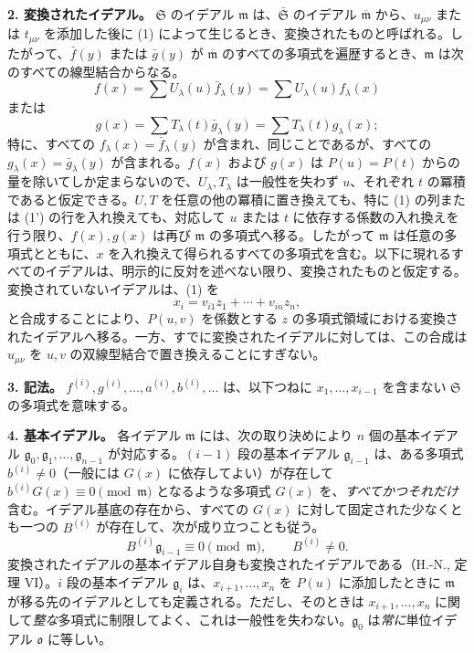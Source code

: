 \documentclass[11pt]{article}
\providecommand{\frakS}{\mathfrak S}
\providecommand{\frakm}{\mathfrak m}
\providecommand{\frakg}{\mathfrak g}
\providecommand{\frako}{\mathfrak o}
\providecommand{\barfrakm}{\overline{\mathfrak m}}
\providecommand{\frako}{\mathfrak o}
\begin{document}
\textbf{2. 変換されたイデアル。} $\frakS$ のイデアル $\frakm$ は、$\bar{\frakS}$ のイデアル $\barfrakm$ から、$u_{\mu\nu}$ または $t_{\mu\nu}$ を添加した後に (1) によって生じるとき、変換されたものと呼ばれる。したがって、$\bar f(y)$ または $\bar g(y)$ が $\barfrakm$ のすべての多項式を遍歴するとき、$\frakm$ は次のすべての線型結合からなる。
\[
 f(x)=\sum U_\lambda(u)\bar f_\lambda(y)=\sum U_\lambda(u)f_\lambda(x)
\]
または
\[
 g(x)=\sum T_\lambda(t)\bar g_\lambda(y)=\sum T_\lambda(t)g_\lambda(x);
\]
特に、すべての $f_\lambda(x)=\bar f_\lambda(y)$ が含まれ、同じことであるが、すべての $g_\lambda(x)=\bar g_\lambda(y)$ が含まれる。$f(x)$ および $g(x)$ は $P(u)=P(t)$ からの量を除いてしか定まらないので、$U_\lambda,T_\lambda$ は一般性を失わず $u$、それぞれ $t$ の冪積であると仮定できる。$U,T$ を任意の他の冪積に置き換えても、特に (1) の列または (1') の行を入れ換えても、対応して $u$ または $t$ に依存する係数の入れ換えを行う限り、$f(x),g(x)$ は再び $\frakm$ の多項式へ移る。したがって $\frakm$ は任意の多項式とともに、$x$ を入れ換えて得られるすべての多項式を含む。以下に現れるすべてのイデアルは、明示的に反対を述べない限り、変換されたものと仮定する。変換されていないイデアルは、(1) を
\[
 x_i=v_{i1}z_1+\cdots+v_{in}z_n,
\]
と合成することにより、$P(u,v)$ を係数とする $z$ の多項式領域における変換されたイデアルへ移る。一方、すでに変換されたイデアルに対しては、この合成は $u_{\mu\nu}$ を $u,v$ の双線型結合で置き換えることにすぎない。

\textbf{3. 記法。} $f^{(i)},g^{(i)},\ldots,a^{(i)},b^{(i)},\ldots$ は、以下つねに $x_1,\ldots,x_{i-1}$ を含まない $\frakS$ の多項式を意味する。

\textbf{4. 基本イデアル。} 各イデアル $\frakm$ には、次の取り決めにより $n$ 個の基本イデアル $\frakg_0,\frakg_1,\ldots,\frakg_{n-1}$ が対応する。$(i-1)$ 段の基本イデアル $\frakg_{i-1}$ は、ある多項式 $b^{(i)}\ne0$（一般には $G(x)$ に依存してよい）が存在して $b^{(i)}G(x)\equiv0\pmod{\frakm}$ となるような多項式 $G(x)$ を、\emph{すべてかつそれだけ}含む。イデアル基底の存在から、すべての $G(x)$ に対して固定された少なくとも一つの $B^{(i)}$ が存在して、次が成り立つことも従う。
\begin{equation}
 B^{(i)}\frakg_{i-1}\equiv0\pmod{\frakm},\qquad B^{(i)}\ne0 . \tag{2}
\end{equation}
変換されたイデアルの基本イデアル自身も変換されたイデアルである（H.-N., 定理 VI）。$i$ 段の基本イデアル $\frakg_i$ は、$x_{i+1},\ldots,x_n$ を $P(u)$ に添加したときに $\frakm$ が移る先のイデアルとしても定義される。ただし、\mbox{そのとき}は $x_{i+1},\ldots,x_n$ に関して\emph{整な}多項式に制限してよく、これは一般性を失わない。$\frakg_0$ は\emph{常に}単位イデアル $\frako$ に等しい。
\end{document}
